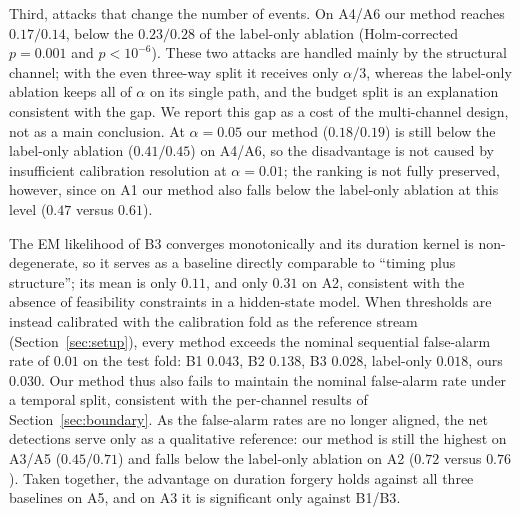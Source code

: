 \documentclass[manuscript,screen,review]{acmart}
\begin{document}
Third, attacks that change the number of events. On {A4}/{A6} our method reaches $0.17/0.14$, below the $0.23/0.28$ of the label-only ablation (Holm-corrected $p=0.001$ and $p<10^{-6}$). These two attacks are handled mainly by the structural channel; with the even three-way split it receives only $\alpha/3$, whereas the label-only ablation keeps all of $\alpha$ on its single path, and the budget split is an explanation consistent with the gap. We report this gap as a cost of the multi-channel design, not as a main conclusion. At $\alpha=0.05$ our method ($0.18/0.19$) is still below the label-only ablation ($0.41/0.45$) on {A4}/{A6}, so the disadvantage is not caused by insufficient calibration resolution at $\alpha=0.01$; the ranking is not fully preserved, however, since on {A1} our method also falls below the label-only ablation at this level ($0.47$ versus $0.61$).

The {EM} likelihood of {B3} converges monotonically and its duration kernel is non-degenerate, so it serves as a baseline directly comparable to ``timing plus structure''; its mean is only $0.11$, and only $0.31$ on {A2}, consistent with the absence of feasibility constraints in a hidden-state model. When thresholds are instead calibrated with the calibration fold as the reference stream (Section~\ref{sec:setup}), every method exceeds the nominal sequential false-alarm rate of $0.01$ on the test fold: {B1} $0.043$, {B2} $0.138$, {B3} $0.028$, label-only $0.018$, ours $0.030$. Our method thus also fails to maintain the nominal false-alarm rate under a temporal split, consistent with the per-channel results of Section~\ref{sec:boundary}. As the false-alarm rates are no longer aligned, the net detections serve only as a qualitative reference: our method is still the highest on {A3}/{A5} ($0.45/0.71$) and falls below the label-only ablation on {A2} ($0.72$ versus $0.76$). Taken together, the advantage on duration forgery holds against all three baselines on {A5}, and on {A3} it is significant only against {B1}/{B3}.
\end{document}
